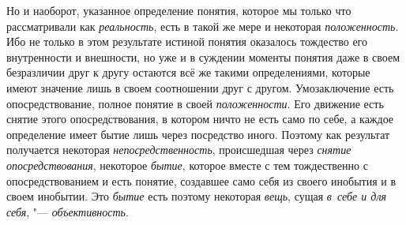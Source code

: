 Но и наоборот, указанное определение понятия, которое мы
только что рассматривали как {\em реальность}, есть в
такой же мере и некоторая {\em положенность}. Ибо
не только в этом результате истиной понятия оказалось тождество его
внутренности и внешности, но уже и в суждении моменты понятия даже в своем
безразличии друг к другу остаются всё же такими определениями, которые
имеют значение лишь в своем соотношении друг с другом. Умозаключение есть
опосредствование, полное понятие в своей {\em положенности}. Его
движение есть снятие этого опосредствования, в котором ничто не есть само
по себе, а каждое определение имеет бытие лишь через посредство иного.
Поэтому как результат получается некоторая {\em непосредственность},
происшедшая через {\em снятие опосредствования}, некоторое {\em бытие},
которое вместе с тем тождественно с опосредствованием и есть
понятие, создавшее само себя из своего инобытия и в своем инобытии. Это
{\em бытие} есть поэтому некоторая {\em вещь}, сущая {\em в~себе и для
себя}, "--- {\em объективность}.

\bigskip

